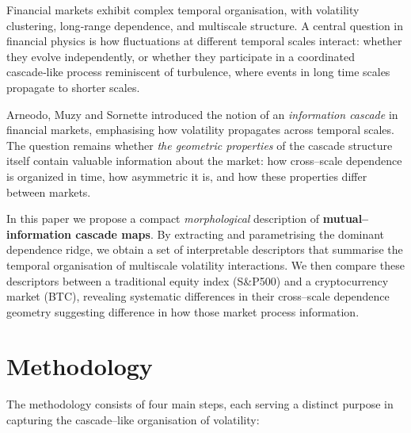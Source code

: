 \documentclass[pdflatex,sn-mathphys-num]{sn-jnl}%
\theoremstyle{thmstyleone}%
\theoremstyle{thmstyletwo}%
\theoremstyle{thmstylethree}%
\begin{document}
Financial markets exhibit complex temporal organisation, with volatility clustering, long‑range dependence, and multiscale structure. A central question in financial physics is how fluctuations at different temporal scales interact: whether they evolve independently, or whether they participate in a coordinated cascade‑like process reminiscent of turbulence, where events in long time scales propagate to shorter scales.

Arneodo, Muzy and Sornette introduced the notion of an \emph{information cascade} in
financial markets, emphasising how volatility propagates across temporal scales.
The question remains whether \emph{the geometric properties} of the cascade structure itself contain valuable information about the market: how cross–scale dependence is organized in time, how asymmetric it is, and how these properties differ between markets.

In this paper we propose a compact \emph{morphological} description of \textbf{mutual–information cascade maps}.
By extracting and parametrising the dominant dependence ridge, we obtain a set of interpretable descriptors that summarise the temporal organisation of multiscale volatility interactions. We then compare these descriptors between a traditional equity index (S\&P500) and a cryptocurrency market (BTC), revealing systematic
differences in their cross–scale dependence geometry suggesting difference in how those market process information.


\section{Methodology} \label{sec:Methodology}

The methodology consists of four main steps, each serving a distinct purpose in capturing the cascade–like organisation of volatility:
\end{document}
